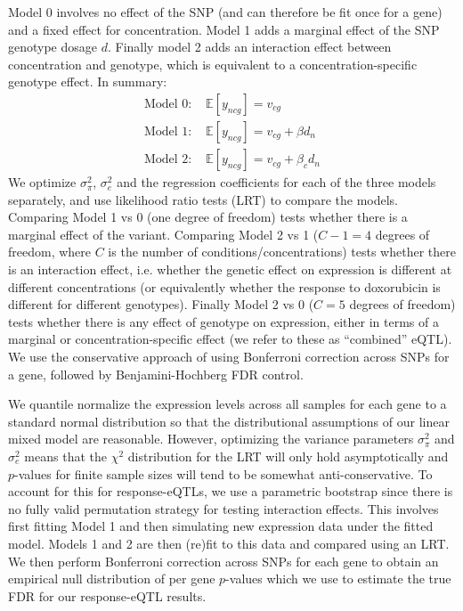\documentclass{article}
\begin{document}
Model 0 involves no effect of the SNP (and can therefore be fit once for a gene) and a fixed effect for concentration. Model 1 adds a marginal effect of the SNP genotype dosage $d$. Finally model 2 adds an interaction effect between concentration and genotype, which is equivalent to a concentration-specific genotype effect. In summary: 
\begin{align}
\text{Model 0: }& \mathbb{E}[ y_{ncg} ] = v_{cg} \\ 
\text{Model 1: }& \mathbb{E}[ y_{ncg} ] = v_{cg} + \beta d_n \\
\text{Model 2: }& \mathbb{E}[ y_{ncg} ] = v_{cg} + \beta_c d_n \label{eq:betac}
\end{align}
We optimize $\sigma^2_\pi$, $\sigma^2_e$ and the regression coefficients for each of the three models separately, and use likelihood ratio tests (LRT) to compare the models. Comparing Model 1 vs 0 (one degree of freedom) tests whether there is a marginal effect of the variant. Comparing Model 2 vs 1 ($C-1=4$ degrees of freedom, where $C$ is the number of conditions/concentrations) tests whether there is an interaction effect, i.e. whether the genetic effect on expression is different at different concentrations (or equivalently whether the response to doxorubicin is different for different genotypes). Finally Model 2 vs 0 ($C=5$ degrees of freedom) tests whether there is any effect of genotype on expression, either in terms of a marginal or concentration-specific effect (we refer to these as ``combined'' eQTL). We use the conservative approach of using Bonferroni correction across SNPs for a gene, followed by Benjamini-Hochberg FDR control. 

We quantile normalize the expression levels across all samples for each gene to a standard normal distribution so that the distributional assumptions of our linear mixed model are reasonable. However, optimizing the variance parameters $\sigma^2_\pi$ and $\sigma^2_e$ means that the $\chi^2$ distribution for the LRT will only hold asymptotically and $p$-values for finite sample sizes will tend to be somewhat anti-conservative. To account for this for response-eQTLs, we use a parametric bootstrap since there is no fully valid permutation strategy for testing interaction effects. This involves first fitting Model 1 and then simulating new expression data under the fitted model. Models 1 and 2 are then (re)fit to this data and compared using an LRT. We then perform Bonferroni correction across SNPs for each gene to obtain an empirical null distribution of per gene $p$-values which we use to estimate the true FDR for our response-eQTL results. 
\end{document}
